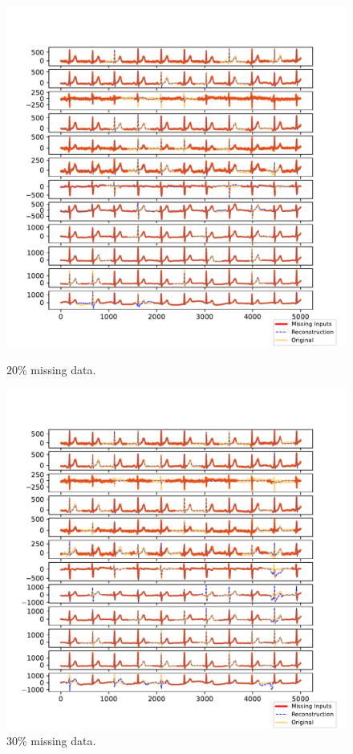 \documentclass{mldsmsc}
\begin{document}
\begin{figure}[H]
\centering
\begin{minipage}{0.4\linewidth}
    \centering
    \includegraphics[width=\linewidth]{images/missing/psmf_output_20_3.pdf}
    \caption{$20\%$ missing data.}
\end{minipage}%
\hspace{0.05\linewidth}
\begin{minipage}{0.4\linewidth}
    \centering
    \includegraphics[width=\linewidth]{images/missing/psmf_output_30_3.pdf}
    \caption{$30\%$ missing data.}
\end{minipage}


\end{figure}
\end{document}
